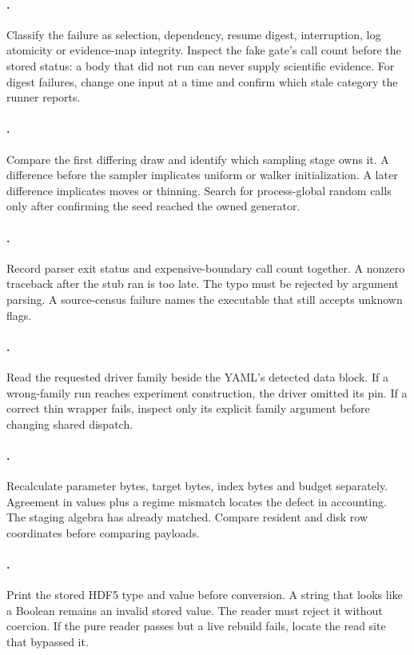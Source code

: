 \paragraph{.}
Classify the failure as selection, dependency, resume digest, interruption,
log atomicity or evidence-map integrity.  Inspect the fake gate's call count
before the stored status: a body that did not run can never supply scientific
evidence.  For digest failures, change one input at a time and confirm which
stale category the runner reports.

\paragraph{.}
Compare the first differing draw and identify which sampling stage owns it.
A difference before the sampler implicates uniform or walker initialization.
A later difference implicates moves or thinning.  Search for process-global
random calls only after confirming the seed reached the owned generator.

\paragraph{.}
Record parser exit status and expensive-boundary call count together.  A
nonzero traceback after the stub ran is too late.  The typo must be rejected by
argument parsing.  A source-census failure names the executable that still
accepts unknown flags.

\paragraph{.}
Read the requested driver family beside the YAML's detected data block.  If a
wrong-family run reaches experiment construction, the driver omitted its pin.
If a correct thin wrapper fails, inspect only its explicit family argument
before changing shared dispatch.

\paragraph{.}
Recalculate parameter bytes, target bytes, index bytes and budget separately.
Agreement in values plus a regime mismatch locates the defect in accounting.
The staging algebra has already matched.  Compare resident and disk row
coordinates before comparing payloads.

\paragraph{.}
Print the stored HDF5 type and value before conversion.  A string that looks
like a Boolean remains an invalid stored value.  The reader must reject it
without coercion.  If the pure reader passes
but a live rebuild fails, locate the read site that bypassed it.

